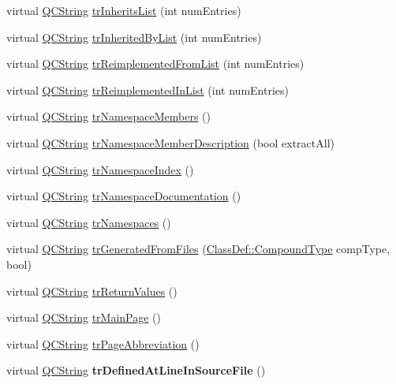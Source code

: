 \begin{DoxyCompactItemize}
\item 
virtual \hyperlink{class_q_c_string}{Q\-C\-String} \hyperlink{class_translator_chinese_a0e30aa3e1bc1c329e36088e46173cd95}{tr\-Inherits\-List} (int num\-Entries)
\item 
virtual \hyperlink{class_q_c_string}{Q\-C\-String} \hyperlink{class_translator_chinese_ae3d0b686686bbad5d0d0c00dd659d05c}{tr\-Inherited\-By\-List} (int num\-Entries)
\item 
virtual \hyperlink{class_q_c_string}{Q\-C\-String} \hyperlink{class_translator_chinese_a3e195179c98c6c78494949095f1c367d}{tr\-Reimplemented\-From\-List} (int num\-Entries)
\item 
virtual \hyperlink{class_q_c_string}{Q\-C\-String} \hyperlink{class_translator_chinese_ae31066cc2f6b74862f2f86e16aeb4a55}{tr\-Reimplemented\-In\-List} (int num\-Entries)
\item 
virtual \hyperlink{class_q_c_string}{Q\-C\-String} \hyperlink{class_translator_chinese_a493f2f99fac12e30e02ee39d5cea79cb}{tr\-Namespace\-Members} ()
\item 
virtual \hyperlink{class_q_c_string}{Q\-C\-String} \hyperlink{class_translator_chinese_abe422143a54da2cad8ae364b45d70eb8}{tr\-Namespace\-Member\-Description} (bool extract\-All)
\item 
virtual \hyperlink{class_q_c_string}{Q\-C\-String} \hyperlink{class_translator_chinese_a5b154bcb92d74bf36e005d6709709f71}{tr\-Namespace\-Index} ()
\item 
virtual \hyperlink{class_q_c_string}{Q\-C\-String} \hyperlink{class_translator_chinese_adace66ae174642555c6277121c712568}{tr\-Namespace\-Documentation} ()
\item 
virtual \hyperlink{class_q_c_string}{Q\-C\-String} \hyperlink{class_translator_chinese_ab509be45cc3774f62f622ccca0ea7e20}{tr\-Namespaces} ()
\item 
virtual \hyperlink{class_q_c_string}{Q\-C\-String} \hyperlink{class_translator_chinese_a0c279f21820edb7886463264e0808645}{tr\-Generated\-From\-Files} (\hyperlink{class_class_def_a768a6f0a6fd7e9087ff7971abbcc3f36}{Class\-Def\-::\-Compound\-Type} comp\-Type, bool)
\item 
virtual \hyperlink{class_q_c_string}{Q\-C\-String} \hyperlink{class_translator_chinese_a2b22c2ac68083d678d14769da085be63}{tr\-Return\-Values} ()
\item 
virtual \hyperlink{class_q_c_string}{Q\-C\-String} \hyperlink{class_translator_chinese_a5c25b54009116727430a4a63a1aaa8aa}{tr\-Main\-Page} ()
\item 
virtual \hyperlink{class_q_c_string}{Q\-C\-String} \hyperlink{class_translator_chinese_af558dc996edc81c3c7d2ebbc8c2a8c6b}{tr\-Page\-Abbreviation} ()
\item 
\hypertarget{class_translator_chinese_a974b1664d5a9d18448015bd37a7c9a35}{virtual \hyperlink{class_q_c_string}{Q\-C\-String} {\bfseries tr\-Defined\-At\-Line\-In\-Source\-File} ()}\label{class_translator_chinese_a974b1664d5a9d18448015bd37a7c9a35}


\end{DoxyCompactItemize}
